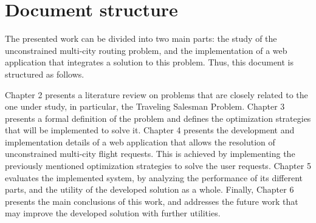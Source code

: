 \section{Document structure}

The presented work can be divided into two main parts: the study of the unconstrained multi-city routing problem, and the implementation of a web application that integrates a solution to this problem. Thus, this document is structured as follows.

Chapter 2 presents a literature review on problems that are closely related to the one under study, in particular, the Traveling Salesman Problem.
Chapter 3 presents a formal definition of the problem and defines the optimization strategies that will be implemented to solve it.
Chapter 4 presents the development and implementation details of a web application that allows the resolution of unconstrained multi-city flight requests. This is achieved by implementing the  previously mentioned optimization strategies to solve the user requests.  
Chapter 5 evaluates the implemented system, by analyzing the performance of its different parts, and the utility of the developed solution as a whole.
Finally, Chapter 6 presents the main conclusions of this work, and addresses the future work that may improve the developed solution with further utilities.

